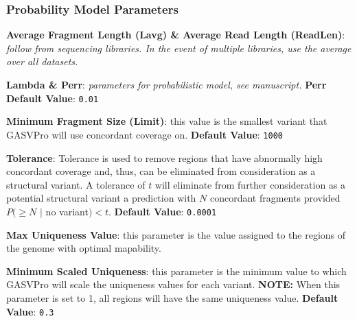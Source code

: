 \documentclass[11pt]{article}
\begin{document}
\subsubsection{Probability Model Parameters}
\begin {description}
\item {\bf Average Fragment Length (Lavg) \& Average Read Length (ReadLen)}: {\em follow from sequencing libraries. In the event of multiple libraries, use the average over all datasets.}
\item{\bf Lambda \& Perr}: {\em parameters for probabilistic model, see manuscript.} {\bf Perr Default Value}: \verb+0.01+
\item {\bf Minimum Fragment Size (Limit)}: this value is the smallest variant that GASVPro will use concordant coverage on. {\bf Default Value}: \verb+1000+
\item {\bf Tolerance}:  Tolerance is used to remove regions that have abnormally high
concordant coverage and, thus, can be eliminated from consideration
as a structural variant. A tolerance of $t$ will eliminate from further consideration as a potential structural variant a prediction with $N$ concordant fragments provided $P(\ge N$ $|$ no variant$) < t$. {\bf Default Value}: \verb+0.0001+
\item{\bf Max Uniqueness Value}:  this parameter is the value assigned to the regions of the genome with optimal mapability. 
\item{\bf Minimum Scaled Uniqueness}:  this parameter is the minimum value to which GASVPro will scale the uniqueness values for each variant. {\bf NOTE:} When this parameter is set to 1, all regions will have the same uniqueness value. {\bf Default Value}: \verb+0.3+
\end{description}
\end{document}
